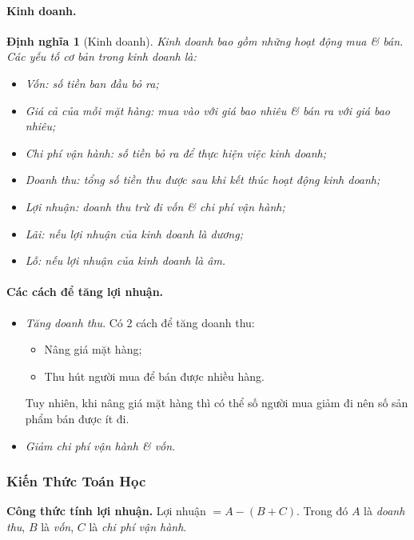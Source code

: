 \documentclass{article}
\numberwithin{equation}{section}
\newtheorem{dinhnghia}{Định nghĩa}[section]
\begin{document}
\paragraph{Kinh doanh.}
\begin{dinhnghia}[Kinh doanh]
	\emph{Kinh doanh} bao gồm những hoạt động mua \textit{\&} bán. Các yếu tố cơ bản trong kinh doanh là:
	\begin{itemize}
		\item \emph{Vốn:} số tiền ban đầu bỏ ra;
		\item \emph{Giá cả của mỗi mặt hàng:} mua vào với giá bao nhiêu \textit{\&} bán ra với giá bao nhiêu;
		\item \emph{Chi phí vận hành:} số tiền bỏ ra để thực hiện việc kinh doanh;
		\item \emph{Doanh thu:} tổng số tiền thu được sau khi kết thúc hoạt động kinh doanh;
		\item \emph{Lợi nhuận:} doanh thu trừ đi vốn \textit{\&} chi phí vận hành;
		\item \emph{Lãi:} nếu lợi nhuận của kinh doanh là dương;
		\item \emph{Lỗ:} nếu lợi nhuận của kinh doanh là âm.
	\end{itemize}
\end{dinhnghia}

\paragraph{Các cách để tăng lợi nhuận.}
\begin{itemize}
	\item \textit{Tăng doanh thu}. Có 2 cách để tăng doanh thu:
	\begin{itemize}
		\item Nâng giá mặt hàng;
		\item Thu hút người mua để bán được nhiều hàng.
	\end{itemize}
	Tuy nhiên, khi nâng giá mặt hàng thì có thể số người mua giảm đi nên số sản phẩm bán được ít đi.
	\item \textit{Giảm chi phí vận hành \textit{\&} vốn}.
\end{itemize}

\subsubsection{Kiến Thức Toán Học}

\begin{tcolorbox}
	\textbf{Công thức tính lợi nhuận.} Lợi nhuận $= A - (B + C)$. Trong đó $A$ là \textit{doanh thu}, $B$ là \textit{vốn}, $C$ là \textit{chi phí vận hành}.
\end{tcolorbox}
\end{document}

